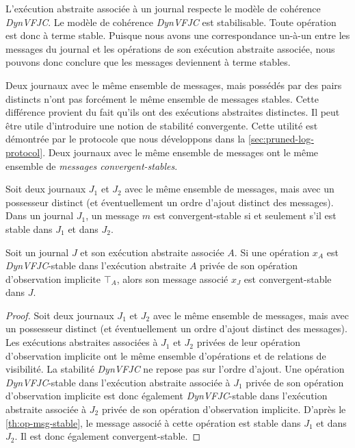 L'exécution abstraite associée à un journal respecte le modèle de cohérence \emph{DynVFJC}.
Le modèle de cohérence \emph{DynVFJC} est stabilisable.
Toute opération est donc à terme stable.
Puisque nous avons une correspondance un-à-un entre les messages du journal et les opérations de son exécution abstraite associée, nous pouvons donc conclure que les messages deviennent à terme stables.


Deux journaux avec le même ensemble de messages, mais possédés par des pairs distincts n'ont pas forcément le même ensemble de messages stables.
Cette différence provient du fait qu'ils ont des exécutions abstraites distinctes.
Il peut être utile d'introduire une notion de stabilité convergente.
Cette utilité est démontrée par le protocole que nous développons dans la \autoref{sec:pruned-log-protocol}.
Deux journaux avec le même ensemble de messages ont le même ensemble de \emph{messages convergent-stables}.

\begin{definition}\label{def:msg-conv-stable}
Soit deux journaux $J_1$ et $J_2$ avec le même ensemble de messages, mais avec un possesseur distinct (et éventuellement un ordre d'ajout distinct des messages).
Dans un journal $J_1$, un message $m$ est convergent-stable si et seulement s'il est stable dans $J_1$ et dans $J_2$.
\end{definition}

\begin{theorem}
Soit un journal $J$ et son exécution abstraite associée $A$.
Si une opération $x_A$ est \emph{DynVFJC}-stable dans l'exécution abstraite $A$ privée de son opération d'observation implicite $\top_A$, alors son message associé $x_J$ est convergent-stable dans $J$.
\end{theorem}

\begin{proof}
Soit deux journaux $J_1$ et $J_2$ avec le même ensemble de messages, mais avec un possesseur distinct (et éventuellement un ordre d'ajout distinct des messages).
Les exécutions abstraites associées à $J_1$ et $J_2$ privées de leur opération d'observation implicite ont le même ensemble d'opérations et de relations de visibilité.
La stabilité \emph{DynVFJC} ne repose pas sur l'ordre d'ajout.
Une opération \emph{DynVFJC}-stable dans l'exécution abstraite associée à $J_1$ privée de son opération d'observation implicite est donc également \emph{DynVFJC}-stable dans l'exécution abstraite associée à $J_2$ privée de son opération d'observation implicite.
D'après le \autoref{th:op-msg-stable}, le message associé à cette opération est stable dans $J_1$ et dans $J_2$.
Il est donc également convergent-stable.
\end{proof}

